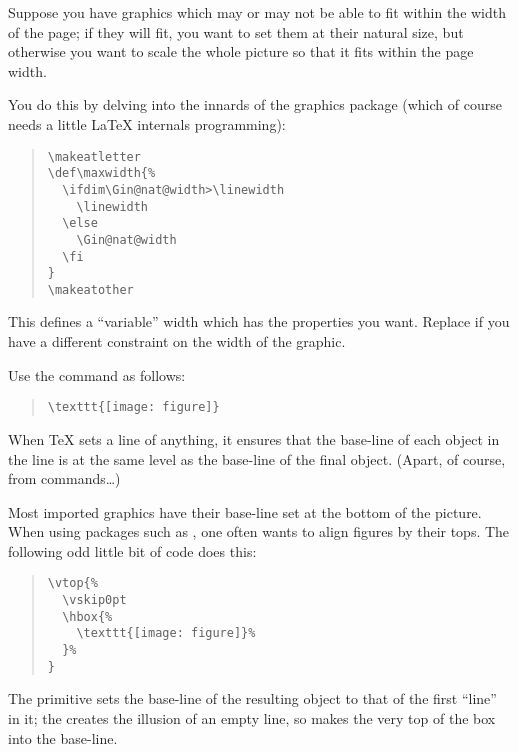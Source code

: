 
Suppose you have graphics which may or may not be able to fit within
the width of the page; if they will fit, you want to set them at their
natural size, but otherwise you want to scale the whole picture so
that it fits within the page width.

You do this by delving into the innards of the graphics package (which
of course needs a little \LaTeX{} internals programming):
\begin{quote}
\begin{verbatim}
\makeatletter
\def\maxwidth{%
  \ifdim\Gin@nat@width>\linewidth
    \linewidth
  \else
    \Gin@nat@width
  \fi
}
\makeatother
\end{verbatim}
\end{quote}
This defines a ``variable'' width which has the properties you want.
Replace  if you have a different constraint on the width
of the graphic.

Use the command as follows:
\begin{quote}
\begin{verbatim}
\texttt{[image: figure]}
\end{verbatim}
\end{quote}


When \TeX{} sets a line of anything, it ensures that the base-line of
each object in the line is at the same level as the base-line of the
final object.  (Apart, of course, from  commands\dots{})

Most imported graphics have their base-line set at the bottom of the
picture.  When using packages such as , one often
wants to align figures by their tops.  The following odd little bit of
code does this:
\begin{quote}
\begin{verbatim}
\vtop{%
  \vskip0pt
  \hbox{%
    \texttt{[image: figure]}%
  }%
}
\end{verbatim}
\end{quote}
The  primitive sets the base-line of the resulting object to
that of the first ``line'' in it; the  creates the illusion
of an empty line, so  makes the very top of the box into the
base-line.

